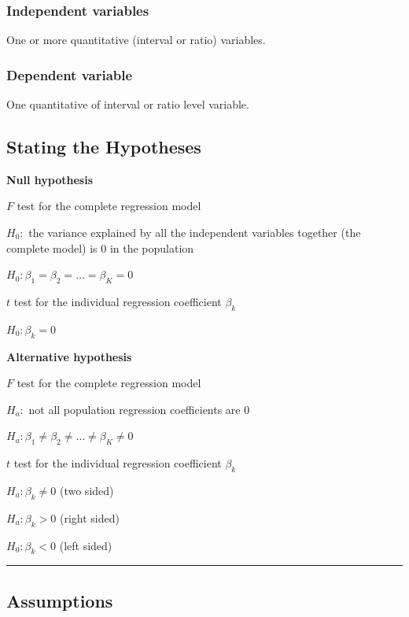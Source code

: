 \documentclass[
]{article}
\begin{document}
\hypertarget{independent-variables}{%
\subsubsection{Independent variables}\label{independent-variables}}

One or more quantitative (interval or ratio) variables.

\hypertarget{dependent-variable}{%
\subsubsection{Dependent variable}\label{dependent-variable}}

One quantitative of interval or ratio level variable.

\hypertarget{stating-the-hypotheses}{%
\subsection{Stating the Hypotheses}\label{stating-the-hypotheses}}

\textbf{Null hypothesis}

\(F\) test for the complete regression model

\(H_0:\) the variance explained by all the independent variables together (the complete model) is 0 in the population

\(H_0:\beta_1 = \beta_2 = \ldots = \beta_K = 0\)

\(t\) test for the individual regression coefficient \(\beta_k\)

\(H_0: \beta_k = 0\)

\textbf{Alternative hypothesis}

\(F\) test for the complete regression model

\(H_a:\) not all population regression coefficients are 0

\(H_a:\beta_1 \neq \beta_2 \neq \ldots \neq \beta_K \neq 0\)

\(t\) test for the individual regression coefficient \(\beta_k\)

\(H_a: \beta_k \neq 0\) (two sided)

\(H_a: \beta_k > 0\) (right sided)

\(H_0: \beta_k < 0\) (left sided)

\begin{center}\rule{0.5\linewidth}{0.5pt}\end{center}

\hypertarget{assumptions}{%
\subsection{Assumptions}\label{assumptions}}
\end{document}
